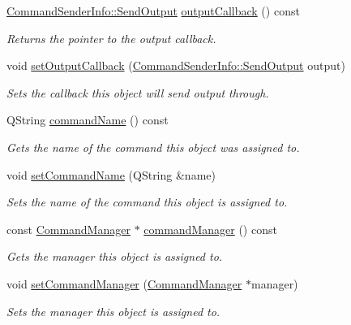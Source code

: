 \begin{DoxyCompactItemize}
\hyperlink{class_command_sender_info_a68c494ef69a25ac7bf667b83e24639ed}{Command\-Sender\-Info\-::\-Send\-Output} \hyperlink{class_command_sender_info_a689dcd3ee607d6f7548f37acfd9545fb}{output\-Callback} () const 
\begin{DoxyCompactList}\small\item\em Returns the pointer to the output callback. \end{DoxyCompactList}\item 
void \hyperlink{class_command_sender_info_a4cd8d7cbb6810d91565534616d3566c3}{set\-Output\-Callback} (\hyperlink{class_command_sender_info_a68c494ef69a25ac7bf667b83e24639ed}{Command\-Sender\-Info\-::\-Send\-Output} output)
\begin{DoxyCompactList}\small\item\em Sets the callback this object will send output through. \end{DoxyCompactList}\item 
Q\-String \hyperlink{class_command_sender_info_ad170306b2bdd8e76016aaf485053f9d7}{command\-Name} () const 
\begin{DoxyCompactList}\small\item\em Gets the name of the command this object was assigned to. \end{DoxyCompactList}\item 
void \hyperlink{class_command_sender_info_a35b041f14c94c82d2fd32d1b2877bc54}{set\-Command\-Name} (Q\-String \&name)
\begin{DoxyCompactList}\small\item\em Sets the name of the command this object is assigned to. \end{DoxyCompactList}\item 
const \hyperlink{class_command_manager}{Command\-Manager} $\ast$ \hyperlink{class_command_sender_info_ab2a5d671d9f8b617a2b15675937b7f53}{command\-Manager} () const 
\begin{DoxyCompactList}\small\item\em Gets the manager this object is assigned to. \end{DoxyCompactList}\item 
void \hyperlink{class_command_sender_info_ab61acf2d7dd2ab6b1eb5376ac611041e}{set\-Command\-Manager} (\hyperlink{class_command_manager}{Command\-Manager} $\ast$manager)
\begin{DoxyCompactList}\small\item\em Sets the manager this object is assigned to. \end{DoxyCompactList}\item 

\end{DoxyCompactItemize}
